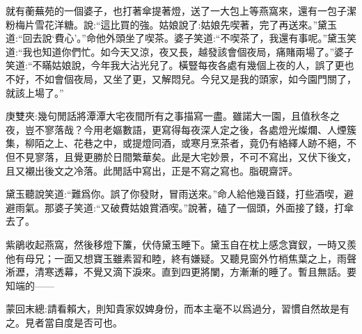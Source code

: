 \begin{parag}
    就有蘅蕪苑的一個婆子，也打著傘提著燈，送了一大包上等燕窩來，還有一包子潔粉梅片雪花洋糖。說:“這比買的強。姑娘說了:姑娘先喫著，完了再送來。”黛玉道:“回去說‘費心’。”命他外頭坐了喫茶。婆子笑道:“不喫茶了，我還有事呢。”黛玉笑道:“我也知道你們忙。如今天又涼，夜又長，越發該會個夜局，痛賭兩場了。”婆子笑道:“不瞞姑娘說，今年我大沾光兒了。橫豎每夜各處有幾個上夜的人，誤了更也不好，不如會個夜局，又坐了更，又解悶兒。今兒又是我的頭家，如今園門關了，就該上場了。”\begin{note}庚雙夾:幾句閒話將潭潭大宅夜間所有之事描寫一盡。雖諾大一園，且值秋冬之夜，豈不寥落哉？今用老嫗數語，更寫得每夜深人定之後，各處燈光燦爛、人煙簇集，柳陌之上、花巷之中，或提燈同酒，或寒月烹茶者，竟仍有絡繹人跡不絕，不但不見寥落，且覺更勝於日間繁華矣。此是大宅妙景，不可不寫出，又伏下後文，且又襯出後文之冷落。此閒話中寫出，正是不寫之寫也。脂硯齋評。\end{note}黛玉聽說笑道:“難爲你。誤了你發財，冒雨送來。”命人給他幾百錢，打些酒喫，避避雨氣。那婆子笑道:“又破費姑娘賞酒喫。”說著，磕了一個頭，外面接了錢，打傘去了。
\end{parag}


\begin{parag}
    紫鵑收起燕窩，然後移燈下簾，伏侍黛玉睡下。黛玉自在枕上感念寶釵，一時又羨他有母兄；一面又想寶玉雖素習和睦，終有嫌疑。又聽見窗外竹梢焦葉之上，雨聲淅瀝，清寒透幕，不覺又滴下淚來。直到四更將闌，方漸漸的睡了。暫且無話。要知端的——
\end{parag}


\begin{parag}
    \begin{note}蒙回末總:請看賴大，則知貴家奴婢身份，而本主毫不以爲過分，習慣自然故是有之。見者當自度是否可也。\end{note}
\end{parag}

